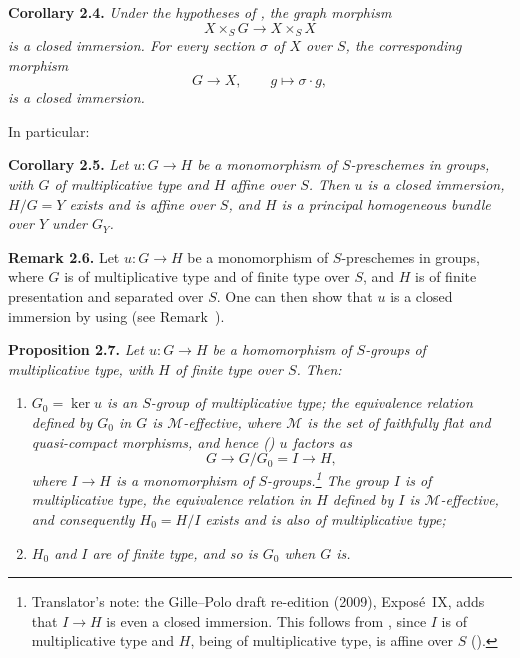 \medskip
\noindent{}\textbf{Corollary 2.4.}
\textit{Under the hypotheses of ,
the graph morphism}
\[
  X\times_S G\longrightarrow X\times_S X
\]
\textit{is a closed immersion. For every section \(\sigma\) of \(X\)
over \(S\), the corresponding morphism}
\[
  G\longrightarrow X,\qquad g\longmapsto\sigma\cdot g,
\]
\textit{is a closed immersion.}

In particular:

\medskip
\noindent{}\textbf{Corollary 2.5.}
\textit{Let \(u:G\to H\) be a monomorphism of \(S\)-preschemes in groups,
with \(G\) of multiplicative type and \(H\) affine over \(S\). Then \(u\)
is a closed immersion, \(H/G=Y\) exists and is affine over \(S\), and
\(H\) is a principal homogeneous bundle over \(Y\) under \(G_Y\).}

\medskip
\noindent{}\textbf{Remark 2.6.}
Let \(u:G\to H\) be a monomorphism of \(S\)-preschemes in groups, where
\(G\) is of multiplicative type and of finite type over \(S\), and \(H\)
is of finite presentation and separated over \(S\). One can then show
that \(u\) is a closed immersion by using  (see
Remark~).

\medskip
\noindent{}\textbf{Proposition 2.7.}
\textit{Let \(u:G\to H\) be a homomorphism of \(S\)-groups of
multiplicative type, with \(H\) of finite type over \(S\). Then:}
\begin{enumerate}
  \item[(i)]
  \textit{\(G_0=\ker u\) is an \(S\)-group of multiplicative type; the
  equivalence relation defined by \(G_0\) in \(G\) is
  \(\mathcal M\)-effective, where \(\mathcal M\) is the set of faithfully
  flat and quasi-compact morphisms, and hence () \(u\) factors as}
  \[
    G\longrightarrow G/G_0=I\longrightarrow H,
  \]
  \textit{where \(I\to H\) is a monomorphism of \(S\)-groups.\footnote{Translator's note: the Gille--Polo draft re-edition (2009), Expos\'e~IX, adds that \(I\to H\) is even a closed immersion. This follows from , since \(I\) is of multiplicative type and \(H\), being of multiplicative type, is affine over \(S\) ().} The group \(I\) is of
  multiplicative type, the equivalence relation in \(H\) defined by \(I\)
  is \(\mathcal M\)-effective, and consequently \(H_0=H/I\) exists and is
  also of multiplicative type;}

  \item[(ii)]
  \textit{\(H_0\) and \(I\) are of finite type, and so is \(G_0\) when
  \(G\) is.}
\end{enumerate}

